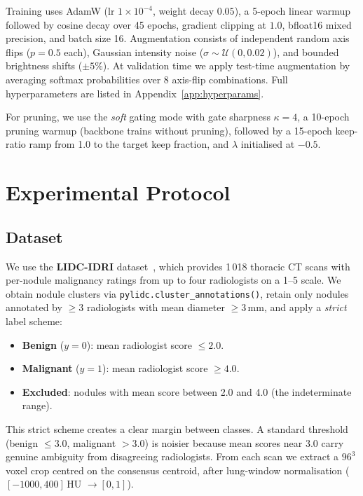 \documentclass[journal]{IEEEtran}
\begin{document}
Training uses AdamW (lr $1\!\times\!10^{-4}$, weight decay $0.05$), a
5-epoch linear warmup followed by cosine decay over 45 epochs, gradient
clipping at $1.0$, bfloat16 mixed precision, and batch size 16.
Augmentation consists of independent random axis flips ($p = 0.5$ each),
Gaussian intensity noise ($\sigma \sim \mathcal{U}(0, 0.02)$), and bounded
brightness shifts ($\pm 5\%$). At validation time we apply test-time
augmentation by averaging softmax probabilities over 8 axis-flip
combinations. Full hyperparameters are listed in
Appendix~\ref{app:hyperparams}.

For pruning, we use the \emph{soft} gating mode with gate sharpness
$\kappa = 4$, a 10-epoch pruning warmup (backbone trains without pruning),
followed by a 15-epoch keep-ratio ramp from 1.0 to the target keep fraction,
and $\lambda$ initialised at $-0.5$.

\section{Experimental Protocol}\label{sec:experiments}

\subsection{Dataset}
We use the \textbf{LIDC-IDRI} dataset~\cite{armato2011}, which provides 1\,018
thoracic CT scans with per-nodule malignancy ratings from up to four
radiologists on a 1--5 scale. We obtain nodule clusters via
\texttt{pylidc.cluster\_annotations()}, retain only nodules annotated by
$\geq\!3$ radiologists with mean diameter $\geq\!3$\,mm, and apply a
\emph{strict} label scheme:
\begin{itemize}
    \item \textbf{Benign} ($y = 0$): mean radiologist score $\leq 2.0$.
    \item \textbf{Malignant} ($y = 1$): mean radiologist score $\geq 4.0$.
    \item \textbf{Excluded}: nodules with mean score between 2.0 and 4.0
    (the indeterminate range).
\end{itemize}
This strict scheme creates a clear margin between classes. A standard
threshold (benign $\leq 3.0$, malignant $> 3.0$) is noisier because mean
scores near 3.0 carry genuine ambiguity from disagreeing radiologists. From
each scan we extract a $96^3$ voxel crop centred on the consensus centroid,
after lung-window normalisation ($[-1000, 400]$\,HU $\rightarrow [0, 1]$).
\end{document}
